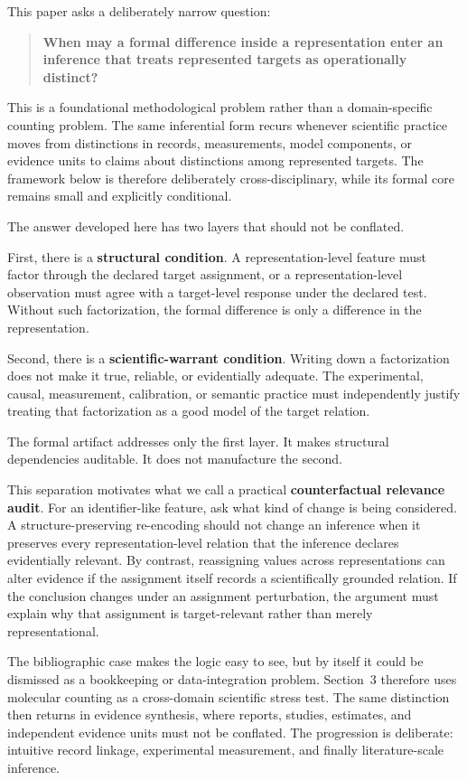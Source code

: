 \documentclass[11pt]{article}
\begin{document}
This paper asks a deliberately narrow question:

\begin{quote}
\textbf{When may a formal difference inside a representation enter an inference that treats represented targets as operationally distinct?}
\end{quote}

This is a foundational methodological problem rather than a domain-specific counting problem. The same inferential form recurs whenever scientific practice moves from distinctions in records, measurements, model components, or evidence units to claims about distinctions among represented targets. The framework below is therefore deliberately cross-disciplinary, while its formal core remains small and explicitly conditional.

The answer developed here has two layers that should not be conflated.

First, there is a \textbf{structural condition}. A representation-level feature must factor through the declared target assignment, or a representation-level observation must agree with a target-level response under the declared test. Without such factorization, the formal difference is only a difference in the representation.

Second, there is a \textbf{scientific-warrant condition}. Writing down a factorization does not make it true, reliable, or evidentially adequate. The experimental, causal, measurement, calibration, or semantic practice must independently justify treating that factorization as a good model of the target relation.

The formal artifact addresses only the first layer. It makes structural dependencies auditable. It does not manufacture the second.

This separation motivates what we call a practical \textbf{counterfactual relevance audit}. For an identifier-like feature, ask what kind of change is being considered. A structure-preserving re-encoding should not change an inference when it preserves every representation-level relation that the inference declares evidentially relevant. By contrast, reassigning values across representations can alter evidence if the assignment itself records a scientifically grounded relation. If the conclusion changes under an assignment perturbation, the argument must explain why that assignment is target-relevant rather than merely representational.

The bibliographic case makes the logic easy to see, but by itself it could be dismissed as a bookkeeping or data-integration problem. Section~3 therefore uses molecular counting as a cross-domain scientific stress test. The same distinction then returns in evidence synthesis, where reports, studies, estimates, and independent evidence units must not be conflated. The progression is deliberate: intuitive record linkage, experimental measurement, and finally literature-scale inference.
\end{document}
